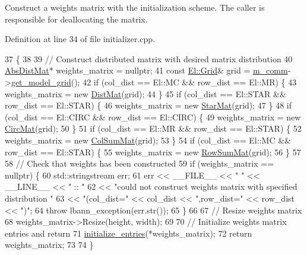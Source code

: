 Construct a weights matrix with the initialization scheme. The caller is responsible for deallocating the matrix. 

Definition at line 34 of file initializer.\+cpp.


\begin{DoxyCode}
37                                                                                  \{
38 
39   \textcolor{comment}{// Construct distributed matrix with desired matrix distribution}
40   \hyperlink{base_8hpp_a9a697a504ae84010e7439ffec862b470}{AbsDistMat}* weights\_matrix = \textcolor{keyword}{nullptr};
41   \textcolor{keyword}{const} \hyperlink{base_8hpp_a9951bb1719d534e0401b1f06cad19eab}{El::Grid}& grid = \hyperlink{classlbann_1_1weights__initializer_a4273257d92237a75ef9f3614f7e5ddde}{m\_comm}->\hyperlink{classlbann_1_1lbann__comm_a483bf8a72d44a0e83da45f3d47bd20d4}{get\_model\_grid}();
42   \textcolor{keywordflow}{if} (col\_dist == El::MC && row\_dist == El::MR) \{
43     weights\_matrix = \textcolor{keyword}{new} \hyperlink{base_8hpp_a0fab5387556805cfeac3e7e567bf66c5}{DistMat}(grid);
44   \}
45   \textcolor{keywordflow}{if} (col\_dist == El::STAR && row\_dist == El::STAR) \{
46     weights\_matrix = \textcolor{keyword}{new} \hyperlink{base_8hpp_aba08580d21767b53d0737e115d738dbe}{StarMat}(grid);
47   \}
48   \textcolor{keywordflow}{if} (col\_dist == El::CIRC && row\_dist == El::CIRC) \{
49     weights\_matrix = \textcolor{keyword}{new} \hyperlink{base_8hpp_a48abd140bc807a8ac1381efd1bfeb375}{CircMat}(grid);
50   \}
51   \textcolor{keywordflow}{if} (col\_dist == El::MR && row\_dist == El::STAR) \{
52     weights\_matrix = \textcolor{keyword}{new} \hyperlink{base_8hpp_a0763642f39727a5694418163464f0045}{ColSumMat}(grid);
53   \}
54   \textcolor{keywordflow}{if} (col\_dist == El::MC && row\_dist == El::STAR) \{
55     weights\_matrix = \textcolor{keyword}{new} \hyperlink{base_8hpp_a6fe2af900f785594ffdbf1e90816a4d3}{RowSumMat}(grid);
56   \}
57 
58   \textcolor{comment}{// Check that weights has been constructed}
59   \textcolor{keywordflow}{if} (weights\_matrix == \textcolor{keyword}{nullptr}) \{
60     std::stringstream err;
61     err << \_\_FILE\_\_ << \textcolor{stringliteral}{" "} << \_\_LINE\_\_ << \textcolor{stringliteral}{" :: "}
62         << \textcolor{stringliteral}{"could not construct weights matrix with specified distribution "}
63         << \textcolor{stringliteral}{"(col\_dist="} << col\_dist << \textcolor{stringliteral}{",row\_dist="} << row\_dist << \textcolor{stringliteral}{")"};
64     \textcolor{keywordflow}{throw} lbann\_exception(err.str());
65   \}
66 
67   \textcolor{comment}{// Resize weights matrix}
68   weights\_matrix->Resize(height, width);
69 
70   \textcolor{comment}{// Initialize weights matrix entries and return}
71   \hyperlink{classlbann_1_1weights__initializer_a2ad6acf904c0c7bc7406dbd9851107be}{initialize\_entries}(*weights\_matrix);
72   \textcolor{keywordflow}{return} weights\_matrix;
73 
74 \}
\end{DoxyCode}
